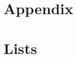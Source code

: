 \documentclass  [
  paper    = a4,
  BCOR     = 10mm,
  twoside,
  fontsize = 12pt,
  fleqn,
  toc      = bibnumbered,
  toc      = listofnumbered,
  numbers  = noendperiod,
  headings = normal,
  listof   = leveldown,
  version  = 3.03
]                                       {scrreprt}
\begin{document}
  

  \tableofcontents
	
	
	
	
	
	
	
	\chapter*{Appendix}
  \chapter{Lists}
  \listoffigures
  \listoftables
  
  
  
\end{document}
